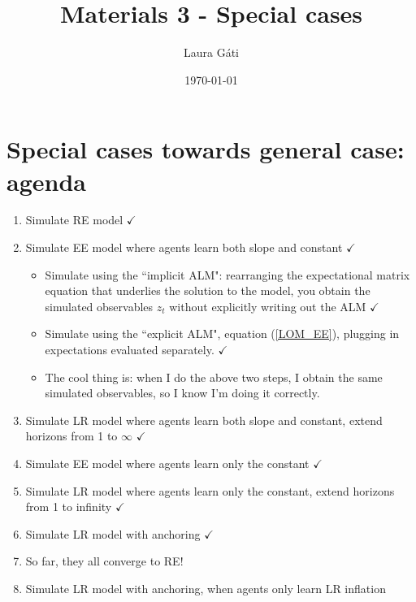 \documentclass[11pt]{article}
\renewcommand{\[}{\begin{equation}}
\renewcommand{\]}{\end{equation}}
\begin{document}
\linespread{1.0}

\title{Materials 3 - Special cases}
\author{Laura G\'ati} 
\date{\today}
\maketitle


\tableofcontents


\newpage

\section{Special cases towards general case: agenda}
\begin{enumerate}
\item Simulate RE model $\checkmark$
\item Simulate EE model where agents learn both slope and constant $\checkmark$
	\begin{itemize}
	\item Simulate using the ``implicit ALM": rearranging the expectational matrix equation that underlies the solution to the model, you obtain the simulated observables $z_t$ without explicitly writing out the ALM $\checkmark$
	\item Simulate using the ``explicit ALM", equation (\ref{LOM_EE}), plugging in expectations evaluated separately. $\checkmark$
	\item[] The cool thing is: when I do the above two steps, I obtain the same simulated observables, so I know I'm doing it correctly.
 	\end{itemize}
\item Simulate LR model where agents learn both slope and constant, extend horizons from 1 to $\infty$ $\checkmark$
\item Simulate EE model where agents learn only the constant $\checkmark$
\item Simulate LR model where agents learn only the constant, extend horizons from 1 to infinity $\checkmark$
\item Simulate LR model with anchoring $\checkmark$
\item[]So far, they all converge to RE!
\item Simulate LR model with anchoring, when agents only learn LR inflation
\end{enumerate}
\end{document}
